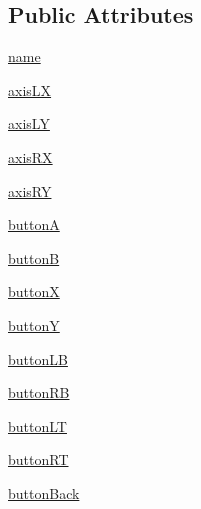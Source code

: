 \subsection*{Public Attributes}
\begin{DoxyCompactItemize}
\item 
\hyperlink{classmodel_1_1LOGITECH__GAMEPAD__MODEL_1_1LogitechGamepadModel_aca968abc43721d36876b94f20d9710d4}{name}
\item 
\hyperlink{classmodel_1_1LOGITECH__GAMEPAD__MODEL_1_1LogitechGamepadModel_ae06162ea90b5693d17eafe7b409befbf}{axis\+L\+X}
\item 
\hyperlink{classmodel_1_1LOGITECH__GAMEPAD__MODEL_1_1LogitechGamepadModel_a31e503a0ce36f109abf7f77d7947fd19}{axis\+L\+Y}
\item 
\hyperlink{classmodel_1_1LOGITECH__GAMEPAD__MODEL_1_1LogitechGamepadModel_ab17ce1369de5fe967d8b8c73878fbd52}{axis\+R\+X}
\item 
\hyperlink{classmodel_1_1LOGITECH__GAMEPAD__MODEL_1_1LogitechGamepadModel_ade6496f07c4f4262a30d7c2c28615023}{axis\+R\+Y}
\item 
\hyperlink{classmodel_1_1LOGITECH__GAMEPAD__MODEL_1_1LogitechGamepadModel_aedc880781d845d342dbb2bd108eaba01}{button\+A}
\item 
\hyperlink{classmodel_1_1LOGITECH__GAMEPAD__MODEL_1_1LogitechGamepadModel_aaa57eb747fdecfcec0ead5b0f44e419d}{button\+B}
\item 
\hyperlink{classmodel_1_1LOGITECH__GAMEPAD__MODEL_1_1LogitechGamepadModel_a670e7ef57a4bf689e482638da67c51a6}{button\+X}
\item 
\hyperlink{classmodel_1_1LOGITECH__GAMEPAD__MODEL_1_1LogitechGamepadModel_a72856dfccd01178bf48d32817812950f}{button\+Y}
\item 
\hyperlink{classmodel_1_1LOGITECH__GAMEPAD__MODEL_1_1LogitechGamepadModel_afe48154427bd2d13420fa732be1e3768}{button\+L\+B}
\item 
\hyperlink{classmodel_1_1LOGITECH__GAMEPAD__MODEL_1_1LogitechGamepadModel_a957467219bf265c86235c336a3ede697}{button\+R\+B}
\item 
\hyperlink{classmodel_1_1LOGITECH__GAMEPAD__MODEL_1_1LogitechGamepadModel_adeac4ea09334e4fefe9ee678a765e3b0}{button\+L\+T}
\item 
\hyperlink{classmodel_1_1LOGITECH__GAMEPAD__MODEL_1_1LogitechGamepadModel_a86da339acfa5067037601408a5d49c24}{button\+R\+T}
\item 
\hyperlink{classmodel_1_1LOGITECH__GAMEPAD__MODEL_1_1LogitechGamepadModel_a69935e9b8ea79f561606c868151c0326}{button\+Back}

\end{DoxyCompactItemize}
